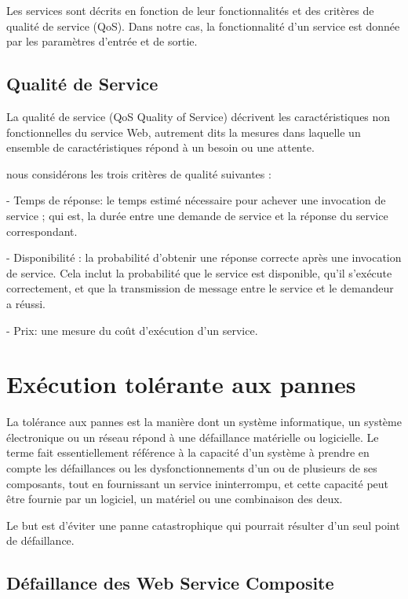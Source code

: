 Les services sont décrits en fonction de leur fonctionnalités et des critères de qualité de service (QoS). Dans notre cas, la fonctionnalité d’un service est donnée par les paramètres d’entrée et de sortie.

\subsection { Qualité de Service }

La qualité de service (QoS Quality of Service) décrivent les caractéristiques non fonctionnelles du service Web, autrement dits la mesures dans laquelle un ensemble de caractéristiques répond à un besoin ou une attente.

nous considérons les trois critères de qualité suivantes \cite{2} :

- Temps de réponse: le temps estimé nécessaire pour achever une invocation de service ; qui est, la durée entre une demande de service et la réponse du service correspondant.

- Disponibilité : la probabilité d’obtenir une réponse correcte après une invocation de service. Cela inclut la probabilité que le service est disponible, qu’il s’exécute correctement, et que la transmission de message entre le
service et le demandeur a réussi.
 
- Prix: une mesure du coût d’exécution d’un service.


\section{Exécution tolérante aux pannes}

La tolérance aux pannes est la manière dont un système informatique, un système électronique ou un réseau répond à une défaillance matérielle ou logicielle. Le terme fait essentiellement référence à la capacité d'un système à prendre en compte les défaillances ou les dysfonctionnements d’un ou de plusieurs de ses composants, tout en fournissant un service ininterrompu, et cette capacité peut être fournie par un logiciel, un matériel ou une combinaison des deux.

Le but est d'éviter une panne catastrophique qui pourrait résulter d'un seul point de défaillance. 

\subsection{Défaillance des Web Service Composite}

